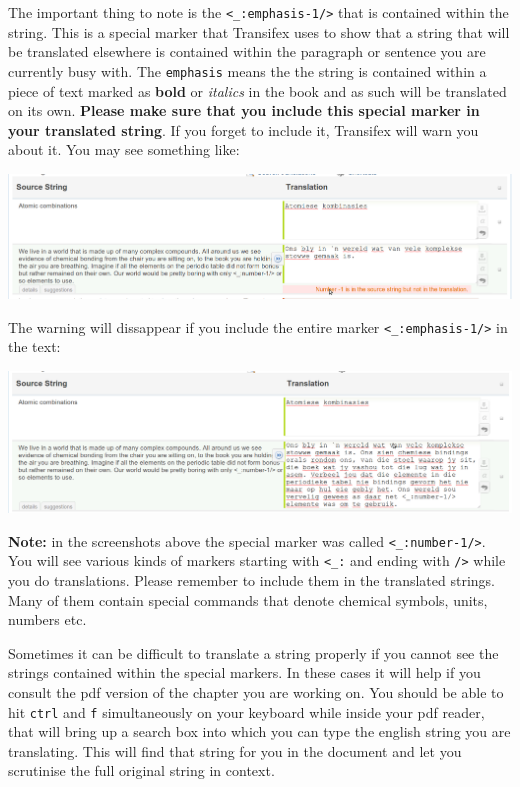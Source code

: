\documentclass[10pt, a4paper]{article}
\begin{document}
The important thing to note is the \verb|<_:emphasis-1/>| that is contained within the string. This is a special marker that Transifex uses to show that a string that will be translated elsewhere is contained within the paragraph or sentence you are currently busy with. The \texttt{emphasis} means the the string is contained within a piece of text marked as \textbf{bold} or \textit{italics} in the book and as such will be translated on its own. \textbf{Please make sure that you include this special marker in your translated string}. If you forget to include it, Transifex will warn you about it. You may see something like:
\begin{center}
    \centerline{\includegraphics[width=0.8\paperwidth]{images/extra_tags.png}}
\end{center}
The warning will dissappear if you include the entire marker \verb|<_:emphasis-1/>| in the text:
\begin{center}
    \centerline{\includegraphics[width=0.8\paperwidth]{images/extra_tags-2.png}}
\end{center}
\textbf{Note:} in the screenshots above the special marker was called \verb|<_:number-1/>|. You will see various kinds of markers starting with \verb|<_:| and ending with \verb|/>| while you do translations. Please remember to include them in the translated strings. Many of them contain special commands that denote chemical symbols, units, numbers etc.

Sometimes it can be difficult to translate a string properly if you cannot see the strings contained within the special markers. In these cases it will help if you consult the pdf version of the chapter you are working on. You should be able to hit \texttt{ctrl} and \texttt{f} simultaneously on your keyboard while inside your pdf reader, that will bring up a search box into which you can type the english string you are translating. This will find that string for you in the document and let you scrutinise the full original string in context.
\end{document}
